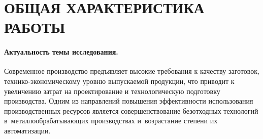 \documentclass[14pt]{extarticle}
\begin{document}
\section*{ОБЩАЯ ХАРАКТЕРИСТИКА РАБОТЫ}

\paragraph*{Актуальность темы исследования.}

Современное производство предъявляет высокие требования к качеству заготовок, 
технико-экономическому уровню выпускаемой продукции, 
что приводит к увеличению затрат на проектирование и технологическую подготовку производства. 
Одним из направлений повышения эффективности использования
производственных ресурсов является совершенствование безотходных технологий
в~металлообрабатывающих производствах и~возрастание степени их автоматизации.
\end{document}
